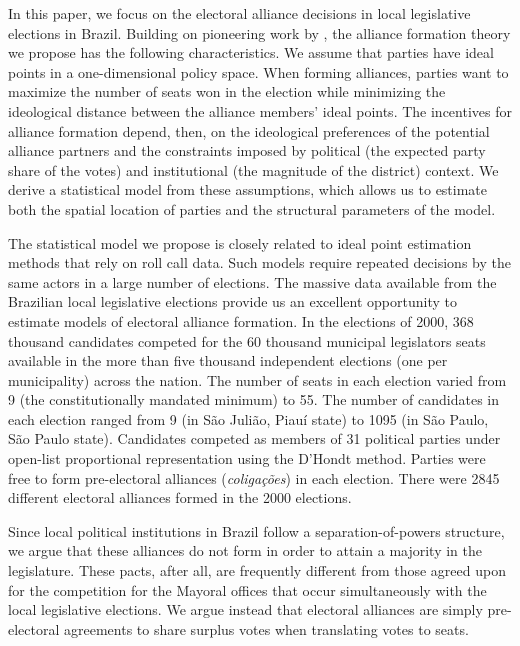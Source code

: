 In this paper, we focus on the electoral alliance decisions in local legislative elections in Brazil. Building on pioneering work by \cite{soares:1964}, the alliance formation theory we propose has the following characteristics. We assume that parties  have ideal points in a one-dimensional policy space. When forming alliances, parties want to maximize the number of seats won in the election while minimizing the ideological distance between the alliance members' ideal points. The incentives for alliance formation depend, then, on the ideological preferences of the potential alliance partners and the constraints imposed by political  (the expected party share of the votes) and institutional (the magnitude of the district) context. We derive a statistical model from these assumptions, which allows us to estimate both the spatial location of parties and the structural parameters of the model.

The statistical model we propose is closely related to ideal point estimation methods that rely on roll call data. Such models require  repeated decisions by the same actors in a large number of elections. The massive data available from the Brazilian local legislative elections provide us an excellent opportunity to estimate models of electoral alliance formation. In the elections of 2000, 368 thousand  candidates competed  for the  60 thousand  municipal legislators seats available in the more than five thousand independent elections (one per municipality) across the nation. The number of seats in each election varied from 9 (the constitutionally mandated minimum) to 55.  The number of candidates in each election ranged from 9 (in São Julião, Piauí state) to 1095 (in São Paulo, São Paulo state).  Candidates competed as members of 31 political parties under open-list proportional representation using the D'Hondt method. Parties were free to form  pre-electoral alliances (\emph{coligações}) in each election. There were 2845 different electoral alliances formed in the 2000 elections.

Since local political institutions in Brazil follow a separation-of-powers structure, we argue that these alliances do not form in order to attain a majority in the legislature. These pacts, after all,  are frequently different from those agreed upon for the competition for the Mayoral offices that occur simultaneously with the local legislative elections.  We argue instead that electoral alliances are simply pre-electoral agreements to share surplus votes when translating votes to seats. 

